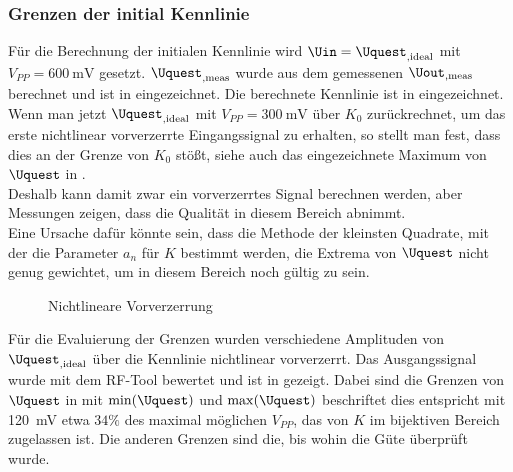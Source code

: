 \documentclass[../Report.tex]{subfiles}
\begin{document}
\subsubsection*{Grenzen der initial Kennlinie}
\label{subsubsec:opt.adjusta.problem}
Für die Berechnung der initialen Kennlinie wird $\Uin = \Uquest_{,\mathrm{ideal}}$ mit $V_{PP} = \SI{600}{\mV}$ gesetzt. $\Uquest_{,\mathrm{meas}}$ wurde aus dem gemessenen $\Uout_{,\mathrm{meas}}$ berechnet und ist in  eingezeichnet. Die berechnete Kennlinie ist in  eingezeichnet. \\
Wenn man jetzt $\Uquest_{, \mathrm{ideal}}$ mit $V_{PP} = \SI{300}{\mV}$ über $K_0$ zurückrechnet, um das erste nichtlinear vorverzerrte Eingangssignal zu erhalten, so stellt man fest, dass dies an der Grenze von $K_0$ stößt, siehe auch das eingezeichnete Maximum von $\Uquest$ in . \\
Deshalb kann damit zwar ein vorverzerrtes Signal berechnen werden, aber Messungen zeigen, dass die Qualität in diesem Bereich abnimmt. \\
Eine Ursache dafür könnte sein, dass die Methode der kleinsten Quadrate, mit der die Parameter $a_n$ für $K$ bestimmt werden, die Extrema von $\Uquest$ nicht genug gewichtet, um in diesem Bereich noch gültig zu sein.
\begin{figure}[H]
\begin{subfigure}{0.5 \textwidth}
	\setlength\figureheight{8cm}
	\setlength\figurewidth{8cm}
    	
	\label{fig:K0}
\end{subfigure}
\begin{subfigure}{0.5 \textwidth}
	\setlength\figureheight{8cm}
	\setlength\figurewidth{8cm}
    
	\label{fig:UinUquest}
\end{subfigure}
\caption{Nichtlineare Vorverzerrung}
\label{fig:Amplitudenproblem}
\end{figure}

Für die Evaluierung der Grenzen wurden verschiedene Amplituden von $\Uquest_{,\textrm{ideal}}$ über die Kennlinie nichtlinear vorverzerrt. Das Ausgangssignal wurde mit dem RF-Tool bewertet und ist in  gezeigt. Dabei sind die Grenzen von $\Uquest$ in  mit $\min(\Uquest)$ und $\max(\Uquest)$ beschriftet dies entspricht mit \SI{120}{\mV} etwa $34\%$ des maximal möglichen $V_{PP}$, das von $K$ im bijektiven Bereich zugelassen ist. Die anderen Grenzen sind die, bis wohin die Güte überprüft wurde.
\end{document}
